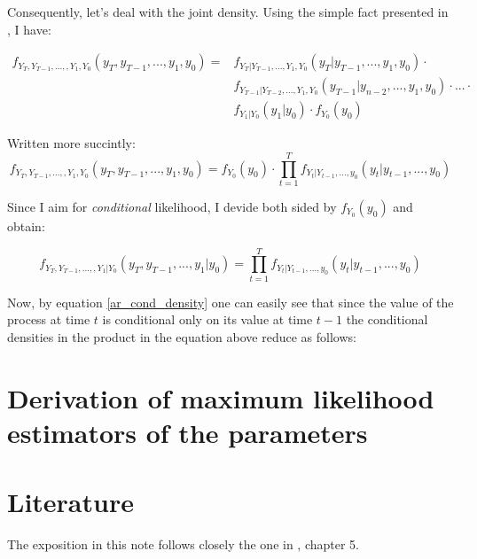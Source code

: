 \documentclass[12pt]{article}
\begin{document}
Consequently, let's deal with the joint density. Using the simple fact presented in
 \cite{my_note_cond_prob_tsa}, I have: 

\begin{equation*}
\begin{split}
f_{Y_T, Y_{T-1}, ..., ,Y_1, Y_0}(y_T, y_{T-1}, ..., y_1, y_0) = 
& f_{Y_T | Y_{T-1}, ..., Y_1, Y_0}(y_T | y_{T-1}, ..., y_1, y_0) \cdot \\
& f_{Y_{T-1} | Y_{T-2}, ..., Y_1, Y_0}(y_{T-1} | y_{n-2}, ..., y_1, y_0) \cdot ... \cdot \\
& f_{Y_1 | Y_0} (y_1 | y_0) \cdot f_{Y_0}(y_0)
\end{split}
\end{equation*}

Written more succintly:
\begin{equation*}
f_{Y_T, Y_{T-1}, ..., ,Y_1, Y_0}(y_T, y_{T-1}, ..., y_1, y_0) = 
f_{Y_0}(y_0) \cdot
 \prod_{t=1}^{T} f_{Y_t | Y_{t-1}, ..., y_0} (y_t | y_{t-1}, ..., y_0)
\end{equation*}

Since I aim for \textit{conditional} likelihood, I devide both sided by $f_{Y_0}(y_0)$ 
and obtain:

\begin{equation*}
f_{Y_T, Y_{T-1}, ..., ,Y_1 | Y_0}(y_T, y_{T-1}, ..., y_1 | y_0) = 
 \prod_{t=1}^{T} f_{Y_t | Y_{t-1}, ..., y_0} (y_t | y_{t-1}, ..., y_0)
\end{equation*}

Now, by equation \ref{ar_cond_density} one can easily see that since the value of the
 process at time $t$ is conditional only on its value at time $t-1$ the conditional 
 densities in the product in the equation above reduce as follows:
 

\section{Derivation of maximum likelihood estimators of the parameters}

\section{Literature}
The exposition in this note follows closely the one in \cite{hamilton_tsa}, chapter 5.



\end{document}
